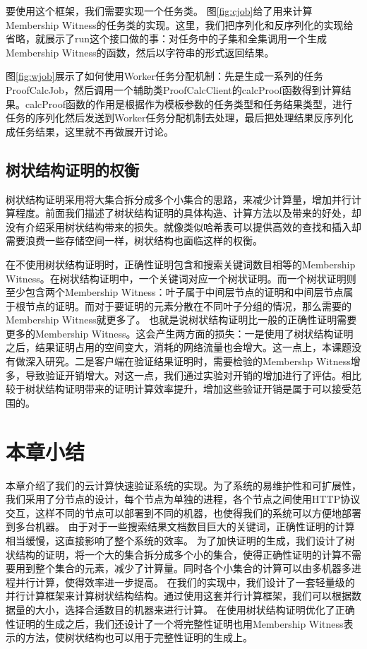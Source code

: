 要使用这个框架，我们需要实现一个任务类。
图\ref{fig:cjob}给了用来计算Membership Witness的任务类的实现。这里，我们把序列化和反序列化的实现给省略，就展示了run这个接口做的事：对任务中的子集和全集调用一个生成Membership Witness的函数，然后以字符串的形式返回结果。


图\ref{fig:wjob}展示了如何使用Worker任务分配机制：先是生成一系列的任务ProofCalcJob，然后调用一个辅助类ProofCalcClient的calcProof函数得到计算结果。calcProof函数的作用是根据作为模板参数的任务类型和任务结果类型，进行任务的序列化然后发送到Worker任务分配机制去处理，最后把处理结果反序列化成任务结果，这里就不再做展开讨论。
\subsection{树状结构证明的权衡}
树状结构证明采用将大集合拆分成多个小集合的思路，来减少计算量，增加并行计算程度。前面我们描述了树状结构证明的具体构造、计算方法以及带来的好处，却没有介绍采用树状结构带来的损失。就像类似哈希表可以提供高效的查找和插入却需要浪费一些存储空间一样，树状结构也面临这样的权衡。

在不使用树状结构证明时，正确性证明包含和搜索关键词数目相等的Membership Witness。在树状结构证明中，一个关键词对应一个树状证明。而一个树状证明则至少包含两个Membership Witness：叶子属于中间层节点的证明和中间层节点属于根节点的证明。而对于要证明的元素分散在不同叶子分组的情况，那么需要的Membership Witness就更多了。
也就是说树状结构证明比一般的正确性证明需要更多的Membership Witness。这会产生两方面的损失：一是使用了树状结构证明之后，结果证明占用的空间变大，消耗的网络流量也会增大。这一点上，本课题没有做深入研究。二是客户端在验证结果证明时，需要检验的Membershp Witness增多，导致验证开销增大。对这一点，我们通过实验对开销的增加进行了评估。相比较于树状结构证明带来的证明计算效率提升，增加这些验证开销是属于可以接受范围的。

\section{本章小结}
本章介绍了我们的云计算快速验证系统的实现。为了系统的易维护性和可扩展性，我们采用了分节点的设计，每个节点为单独的进程，各个节点之间使用HTTP协议交互，这样不同的节点可以部署到不同的机器，也使得我们的系统可以方便地部署到多台机器。
由于对于一些搜索结果文档数目巨大的关键词，正确性证明的计算相当缓慢，这直接影响了整个系统的效率。
为了加快证明的生成，我们设计了树状结构的证明，将一个大的集合拆分成多个小的集合，使得正确性证明的计算不需要用到整个集合的元素，减少了计算量。同时各个小集合的计算可以由多机器多进程并行计算，使得效率进一步提高。
在我们的实现中，我们设计了一套轻量级的并行计算框架来计算树状结构结构。通过使用这套并行计算框架，我们可以根据数据量的大小，选择合适数目的机器来进行计算。
在使用树状结构证明优化了正确性证明的生成之后，我们还设计了一个将完整性证明也用Membership Witness表示的方法，使树状结构也可以用于完整性证明的生成上。
